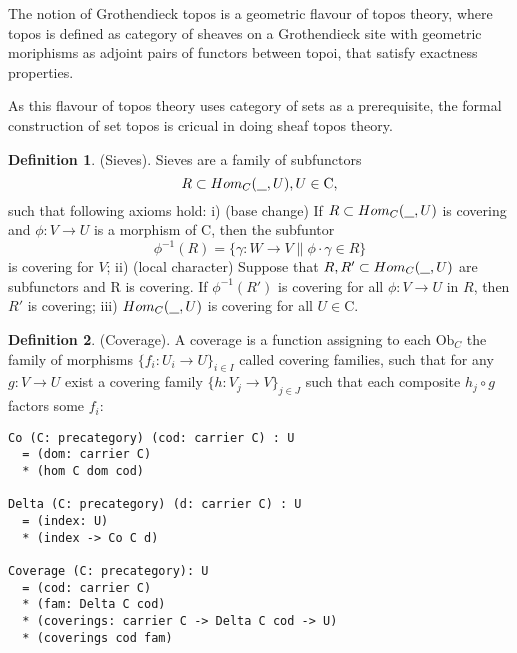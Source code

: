 \documentclass{article}
\theoremstyle{definition}
\newtheorem{definition}{Definition}
\def\mapright#1{\xrightarrow{{#1}}}
\def\mapdown#1{\Big\downarrow\rlap{\raise2pt{\scriptstyle{#1}}}}
\def\mapdiagl#1{\vcenter{\searrow}\rlap{\raise2pt{\scriptstyle{#1}}}}
\def\mapdiagr#1{\vcenter{\swarrow}\rlap{\raise2pt{\scriptstyle{#1}}}}
\def\under{\underline{\hspace{0.25cm}}}
\begin{document}
The notion of Grothendieck topos is a geometric flavour of topos theory,
where topos is defined as category of sheaves on a Grothendieck site with
geometric moriphisms as adjoint pairs of functors between topoi, that
satisfy exactness properties. \cite{Jardine15}

As this flavour of topos theory uses category of sets as a prerequisite,
the formal construction of set topos is cricual in doing sheaf topos theory.

\begin{definition} (Sieves).
Sieves are a family of subfunctors
$$\def\mapright#1{\xrightarrow{{#1}}}
  \def\mapdown#1{\Big\downarrow\rlap{\raise2pt{\scriptstyle{#1}}}}
  \def\mapdiagl#1{\vcenter{\searrow}\rlap{\raise2pt{\scriptstyle{#1}}}}
  \def\mapdiagr#1{\vcenter{\swarrow}\rlap{\raise2pt{\scriptstyle{#1}}}}
  R \subset Hom_C(\under,U), U \in \mathrm{C},
$$
such that following axioms hold: i) (base change) If $R \subset Hom_C(\under,U)$ is covering
and $\phi : V \rightarrow U$ is a morphism of $\mathrm{C}$, then the subfuntor
$$
   \phi^{-1}(R) = \{ \gamma : W \rightarrow V \| \phi \cdot \gamma \in R \}
$$
is covering for $V$; ii) (local character) Suppose that $R,R' \subset Hom_C(\under,U)$ are
subfunctors and R is covering. If $\phi^{-1}(R')$ is covering for
all $\phi : V \rightarrow U$ in $R$, then $R'$ is covering; iii)
$Hom_C(\under,U)$ is covering for all $U \in \mathrm{C}$.
\end{definition}

\newpage
\begin{definition} (Coverage).
A coverage is a function assigning
to each $\mathrm{Ob}_C$ the family of morphisms $\{f_i : U_i \rightarrow U \}_{i\in I}$ called
covering families, such that for any $g: V \rightarrow U$ exist
a covering family $\{h:V_j \rightarrow V\}_{j \in J}$ such that
each composite $h_j \circ g$ factors some $f_i$:
\begin{lstlisting}
Co (C: precategory) (cod: carrier C) : U
  = (dom: carrier C)
  * (hom C dom cod)

Delta (C: precategory) (d: carrier C) : U
  = (index: U)
  * (index -> Co C d)

Coverage (C: precategory): U
  = (cod: carrier C)
  * (fam: Delta C cod)
  * (coverings: carrier C -> Delta C cod -> U)
  * (coverings cod fam)
\end{lstlisting}
\end{definition}
\end{document}
